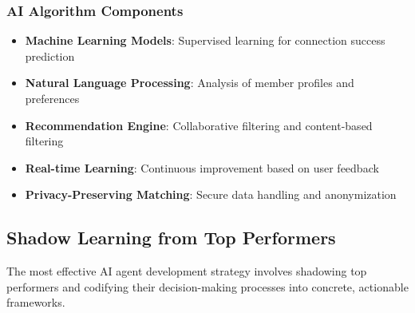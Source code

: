 \subsubsection{AI Algorithm Components}
\begin{itemize}
    \item \textbf{Machine Learning Models}: Supervised learning for connection success prediction
    \item \textbf{Natural Language Processing}: Analysis of member profiles and preferences
    \item \textbf{Recommendation Engine}: Collaborative filtering and content-based filtering
    \item \textbf{Real-time Learning}: Continuous improvement based on user feedback
    \item \textbf{Privacy-Preserving Matching}: Secure data handling and anonymization
\end{itemize}

\subsection{Shadow Learning from Top Performers}
The most effective AI agent development strategy involves shadowing top performers and codifying their decision-making processes into concrete, actionable frameworks.

